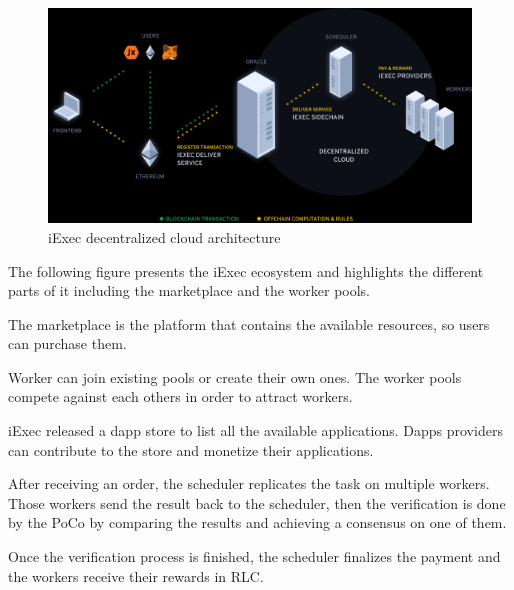         \begin{landscape}
            \begin{figure}
                \includegraphics[width=\columnwidth]{4-Requirements/figs/iexec-decentralized-cloud.png}
                \caption{iExec decentralized cloud architecture}
            \end{figure}
        \end{landscape}

        The following figure\cite{iexec-marketplace} presents the iExec ecosystem and highlights the different parts of it
        including the marketplace and the worker pools.
        
        The marketplace is the platform that contains the available resources, so users can purchase them.
        
        Worker can join existing pools or create their own ones. The worker pools compete against each others
        in order to attract workers.

        iExec released a dapp store to list all the available applications. Dapps providers can contribute to
        the store and monetize their applications.

        After receiving an order, the scheduler replicates the task on multiple workers. Those workers send
        the result back to the scheduler, then the verification is done by the PoCo by comparing the results
        and achieving a consensus on one of them.

        Once the verification process is finished, the scheduler finalizes the payment and the workers
        receive their rewards in RLC.
    

